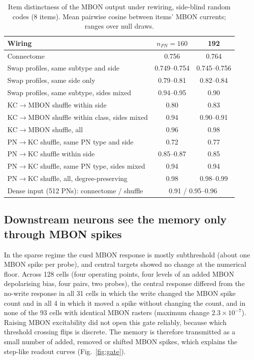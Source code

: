 \documentclass[conference]{IEEEtran}
\begin{document}
\begin{table}[t]
\caption{Item distinctness of the MBON output under rewiring, side-blind
random codes (8 items). Mean pairwise cosine between items' MBON currents;
ranges over null draws.}
\label{tab:route}\centering
\footnotesize\setlength{\tabcolsep}{3pt}
\begin{tabular}{@{}lcc@{}}\toprule
Wiring & $n_{PN}=160$ & 192\\\midrule
Connectome & 0.756 & 0.764\\
Swap profiles, same subtype and side & 0.749--0.754 & 0.745--0.756\\
Swap profiles, same side only & 0.79--0.81 & 0.82--0.84\\
Swap profiles, same subtype, sides mixed & 0.94--0.95 & 0.90\\
KC$\rightarrow$MBON shuffle within side & 0.80 & 0.83\\
KC$\rightarrow$MBON shuffle within class, sides mixed & 0.94 & 0.90--0.91\\
KC$\rightarrow$MBON shuffle, all & 0.96 & 0.98\\
PN$\rightarrow$KC shuffle, same PN type and side & 0.72 & 0.77\\
PN$\rightarrow$KC shuffle within side & 0.85--0.87 & 0.85\\
PN$\rightarrow$KC shuffle, same PN type, sides mixed & 0.94 & 0.94\\
PN$\rightarrow$KC shuffle, all, degree-preserving & 0.98 & 0.98--0.99\\
Dense input (512 PNs): connectome / shuffle & \multicolumn{2}{c}{0.91 / 0.95--0.96}\\\bottomrule
\end{tabular}
\end{table}

\subsection{Downstream neurons see the memory only through MBON spikes}\label{sec:downstream}
\label{sec:gating}
In the sparse regime the cued MBON response is mostly subthreshold (about one
MBON spike per probe), and central targets showed no change at the numerical
floor. Across 128 cells (four operating points, four levels of an added MBON
depolarising bias, four pairs, two probes), the central response differed from
the no-write response in all 31 cells in which the write changed the MBON spike
count and in all 4 in which it moved a spike without changing the count, and
in none of the 93 cells with identical MBON rasters (maximum change
$2.3\times10^{-7}$). Raising MBON excitability did not open this gate
reliably, because which threshold crossing flips is discrete. The memory is
therefore transmitted as a small number of added, removed or shifted MBON
spikes, which explains the step-like readout curves (Fig.~\ref{fig:gate}).
\end{document}
